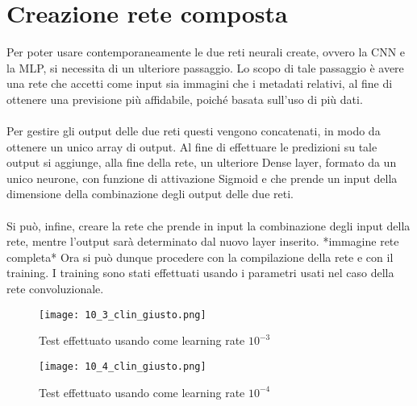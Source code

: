\section{Creazione rete composta}
Per poter usare contemporaneamente le due reti neurali create, ovvero la CNN e la MLP, si necessita di 
un ulteriore passaggio.
Lo scopo di tale passaggio è avere una rete che accetti come input sia immagini che i metadati relativi, al fine
di ottenere una previsione più affidabile, poiché basata sull'uso di più dati.
\\\\
Per gestire gli output delle due reti questi vengono concatenati, in modo da ottenere un unico array di output.
Al fine di effettuare le predizioni su tale output si aggiunge, alla fine della rete, un ulteriore 
Dense layer, formato da un unico neurone, con funzione di attivazione Sigmoid e che prende un input della 
dimensione della combinazione degli output delle due reti. 
\\\\
Si può, infine, creare la rete che prende in input la combinazione degli input della rete, mentre l'output sarà determinato
dal nuovo layer inserito.
*immagine rete completa*
Ora si può dunque procedere con la compilazione della rete e con il training. I training sono stati effettuati usando i parametri usati 
nel caso della rete convoluzionale. 

\begin{figure}[b]
    \centering
    \texttt{[image: 10\_3\_clin\_giusto.png]}
    \label{ 10^{-3} }
    \caption{Test effettuato usando come learning rate $10^{-3}$}
\end{figure}

\begin{figure}[htp]
    \centering
    \texttt{[image: 10\_4\_clin\_giusto.png]}
    \label{10^{-4}}
    \caption{Test effettuato usando come learning rate $10^{-4}$}
\end{figure}